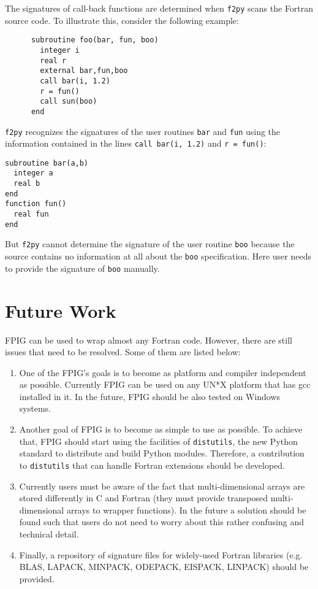 \documentclass[twocolumn]{article}
\newcommand{\fpy}{\texttt{f2py}\xspace}
\begin{document}
The signatures of call-back functions are determined when \fpy scans
the Fortran source code. To illustrate this, consider the following
example:
\begin{verbatim}
      subroutine foo(bar, fun, boo)
        integer i
        real r
        external bar,fun,boo
        call bar(i, 1.2)
        r = fun()
        call sun(boo)
      end
\end{verbatim}
\fpy recognizes the signatures of the user routines \texttt{bar} and
\texttt{fun} using the information contained in the lines \texttt{call
  bar(i, 1.2)} and \texttt{r = fun()}:
\begin{verbatim}
subroutine bar(a,b)
  integer a
  real b
end
function fun()
  real fun
end
\end{verbatim}
But \fpy cannot determine the signature of the user routine
\texttt{boo} because the source contains no information at all about
the \texttt{boo} specification. Here user needs to provide the
signature of \texttt{boo} manually.

\section{Future Work}
\label{sec:future}

FPIG can be used to wrap almost any Fortran code. However, there are
still issues that need to be resolved. Some of them are listed below:
\begin{enumerate}
\item One of the FPIG's goals is to become as platform and compiler
  independent as possible. Currently FPIG can be used on
  any UN*X platform that has gcc installed in it. In the future, FPIG
  should be also tested on Windows systems.
\item Another goal of FPIG is to become as simple to use as
  possible. To achieve that, FPIG should start using the facilities of
  \texttt{distutils}, the new Python standard to distribute and build
  Python modules. Therefore, a contribution to \texttt{distutils}  
  that can handle Fortran extensions should be developed. 
\item Currently users must be aware of
  the fact that multi-dimensional arrays are stored differently in C
  and Fortran (they must provide transposed multi-dimensional arrays
  to wrapper functions). In the future a solution should be found such
  that users do not need to worry about this rather
  confusing and technical detail.
\item Finally, a repository of signature files for widely-used Fortran
  libraries (e.g. BLAS, LAPACK, MINPACK, ODEPACK, EISPACK, LINPACK) should be
  provided.
\end{enumerate}
\end{document}
